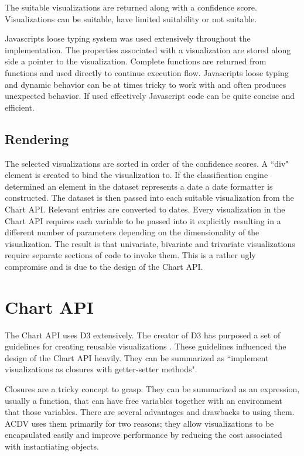 \documentclass[a4paper, 11pt, titlepage, onehalfspacing]{report}
\begin{document}
The suitable visualizations are returned along with a confidence score. Visualizations can be suitable, have limited suitability or not suitable.

Javascripts loose typing system was used extensively throughout the implementation. The properties associated with a visualization are stored along side a pointer to the visualization. Complete functions are returned from functions and used directly to continue execution flow. Javascripts loose typing and dynamic behavior can be at times tricky to work with and often produces unexpected behavior. If used effectively Javascript code can be quite concise and efficient.  


\subsection{Rendering}
The selected visualizations are sorted in order of the confidence scores. A ``div" element is created to bind the visualization to. If the classification engine determined an element in the dataset represents a date a date formatter is constructed. The dataset is then passed into each suitable visualization from the Chart API. Relevant entries are converted to dates. Every visualization in the Chart API requires each variable to be passed into it explicitly resulting in a different number of parameters depending on the dimensionality of the visualization. The result is that univariate, bivariate and trivariate visualizations require separate sections of code to invoke them. This is a rather ugly compromise and is due to the design of the Chart API.

\section{Chart API}
The Chart API uses D3 extensively. The creator of D3 has purposed a set of guidelines for creating reusable visualizations \cite{mikeconvention}. These guidelines influenced the design of the Chart API heavily. They can be summarized as ``implement visualizations as closures with getter-setter methods".

Closures are a tricky concept to grasp. They can be summarized as an expression, usually a function, that can have free variables together with an environment that those variables. There are several advantages and drawbacks to using them. AC\lightning{}DV uses them primarily for two reasons; they allow visualizations to be encapsulated easily and improve performance by reducing the cost associated with instantiating objects.
\end{document}
